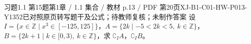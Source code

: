 \par\noindent\begin{minipage}{\linewidth}
\begin{bankitem}{习题1.1 第15题}{第1章 / 1.1 集合 / 教材 p.13 / PDF 第20页}{XJ-B1-C01-HW-P013-Y1352}{已对照原页转写题干及公式；待教师复核；未制作答案}
设 $I=\{x\in\mathbb Z\mid x^3\in[-125,125]\}$，$A=\{2k\mid-5<2k<5,\ k\in\mathbb Z\}$，$B=\{2k+1\mid k\in[0,3),\ k\in\mathbb Z\}$，求 $\complement_I A$，$\complement_I B$。
\end{bankitem}
\end{minipage}\par\medskip
